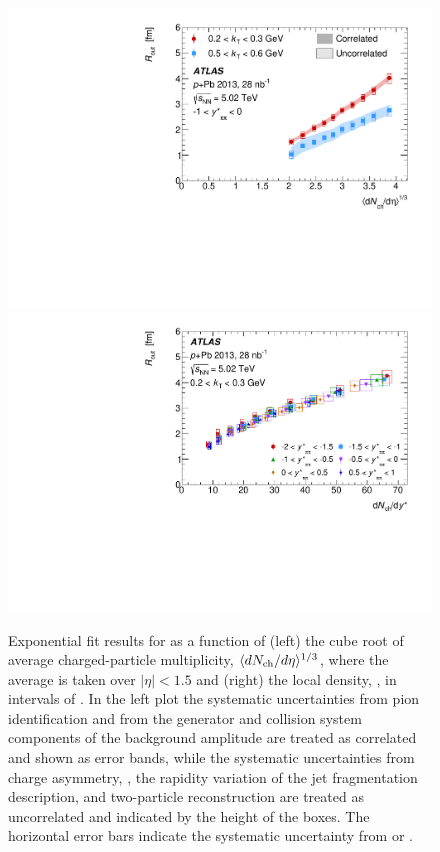 \begin{figure}[t]
\centering
\includegraphics[width=0.49\linewidth]{canqosl_Rout_vs_avg_mult.pdf}
\includegraphics[width=0.49\linewidth]{canqosl_Rout_kt1_vs_mult.pdf}
\caption{Exponential fit results for \Rout as a function of (left) the cube root of average charged-particle multiplicity, $\langle d\mbox{$N_{\mathrm{ch}}$}/d\eta\rangle^{1/3}$, where the average is taken over $|\eta| < 1.5$ and (right) the local density, \dNdy, in intervals of \kys. In the left plot the systematic uncertainties from pion identification and from the generator and collision system components of the background amplitude are treated as correlated and shown as error bands, while the systematic uncertainties from charge asymmetry, \Reff, the rapidity variation of the jet fragmentation description, and two-particle reconstruction are treated as uncorrelated and indicated by the height of the boxes. The horizontal error bars indicate the systematic uncertainty from \avgdNdeta or \dNdy.}
\label{fig:results_Rout_mult}
\end{figure}

